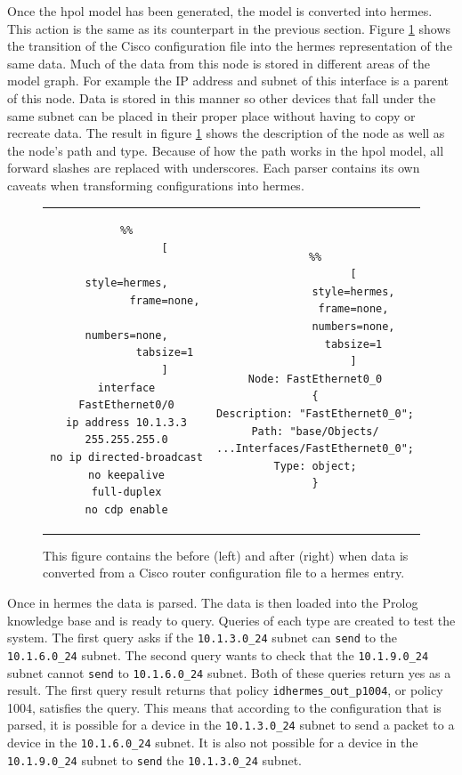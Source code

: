 \documentclass[12pt,letterpaper]{report}
\begin{document}
Once the \ac{hpol} model has been generated, the model is converted into \ac{hermes}. This action is the same as its counterpart in the previous section. Figure \ref{Cisco_Hermes_1} shows the transition of the Cisco configuration file into the \ac{hermes} representation of the same data. Much of the data from this node is stored in different areas of the model graph. For example the IP address and subnet of this interface is a parent of this node. Data is stored in this manner so other devices that fall under the same subnet can be placed in their proper place without having to copy or recreate data. The result in figure \ref{Cisco_Hermes_1} shows the description of the node as well as the node's path and type. Because of how the path works in the \ac{hpol} model, all forward slashes are replaced with underscores. Each parser contains its own caveats when transforming configurations into \ac{hermes}.  

\begin{figure}
	\begin{tabular}{ c | c }
		{\begin{lstlisting}%%
			[
			style=hermes,
			frame=none,
			numbers=none,
			tabsize=1
			]
interface FastEthernet0/0
ip address 10.1.3.3 255.255.255.0
no ip directed-broadcast
no keepalive
full-duplex
no cdp enable
		\end{lstlisting}}
		&
		{\begin{lstlisting}%%
			[
			style=hermes,
			frame=none,
			numbers=none,
			tabsize=1
			]
Node: FastEthernet0_0
{
Description: "FastEthernet0_0";
Path: "base/Objects/
...Interfaces/FastEthernet0_0";
Type: object;
}
		\end{lstlisting}}
	\end{tabular}
	\caption[Cisco Configuration to HERMES Processing and Translation Example]{This figure contains the before (left) and after (right) when data is converted from a Cisco router configuration file to a \ac{hermes} entry.}
	\label{Cisco_Hermes_1}
\end{figure}

Once in \ac{hermes} the data is parsed. The data is then loaded into the Prolog knowledge base and is ready to query. Queries of each type are created to test the system. The first query asks if the \texttt{10.1.3.0\_24} subnet can \texttt{send} to the \texttt{10.1.6.0\_24} subnet. The second query wants to check that the \texttt{10.1.9.0\_24} subnet cannot \texttt{send} to \texttt{10.1.6.0\_24} subnet. Both of these queries return yes as a result. The first query result returns that policy \texttt{idhermes\_out\_p1004}, or policy 1004, satisfies the query. This means that according to the configuration that is parsed, it is possible for a device in the \texttt{10.1.3.0\_24} subnet to send a packet to a device in the \texttt{10.1.6.0\_24} subnet. It is also not possible for a device in the \texttt{10.1.9.0\_24} subnet to \texttt{send} the \texttt{10.1.3.0\_24} subnet. 
\end{document}
